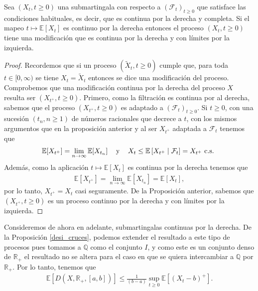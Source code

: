 \begin{proposition}
Sea $(X_t, t \geq 0)$ una submartingala con respecto a $(\mathcal{F}_t)_{t \geq 0}$ que satisface las condiciones habituales, es decir, que es continua por la derecha y completa. Si el mapeo $t \mapsto \mathbb{E}[X_t]$ es continuo por la derecha entonces el proceso $(X_t, t \geq 0)$ tiene una modificación que es continua por la derecha y con límites por la izquierda.
\end{proposition}
\begin{proof}
Recordemos que si un proceso $(\tilde{X}_t, t \geq 0)$ cumple que, para toda $t \in [0, \infty)$ se tiene $X_t = \tilde{X}_t$ entonces se dice una modificación del proceso. \\

Comprobemos que una modificación continua por la derecha del proceso $X$ resulta ser $(X_{t^{+}}, t \geq 0)$. Primero, como la filtración es continua por al derecha, sabemos que el proceso $(X_{t^{+}}, t \geq 0)$ es adaptado a $(\mathcal{F}_t)_{t \geq 0}$. Si $t \geq 0$, con una sucesión $(t_n, n \geq 1)$ de números racionales que decrece a $t$, con los mismos argumentos que en la proposición anterior y al ser $X_{t^{+}}$ adaptada a $\mathcal{F}_t$ tenemos que
\begin{align*}
	\mathbb{E}[X_{t^{+}}] = \lim_{n \rightarrow \infty} \mathbb{E}[X_{t_n}] \hspace{0.3cm} \text{ y } \hspace{0.3cm} X_t \leq \mathbb{E}\left[ X_{t^{+}} \mid  \mathcal{F}_t \right] = X_{t^{+}} \text{ c.s. }
\end{align*}
Además, como la aplicación $t \mapsto \mathbb{E}[X_t]$ es continua por la derecha tenemos que
\begin{align*}
\mathbb{E}[X_{t^{+}}] = \lim_{n \rightarrow \infty} \mathbb{E}[X_{t_n}] = \mathbb{E}[X_t], 
\end{align*}
por lo tanto, $X_{t^{+}} = X_t$ casi seguramente. De la Proposición anterior, sabemos que $(X_{t^{+}}, t \geq 0)$ es un proceso continuo por la derecha y con límites por la izquierda.
\end{proof}

Consideremos de ahora en adelante, submartingalas continuas por la derecha. De la Proposición \ref{desi_cruces}, podemos extender el resultado a este tipo de procesos pues tomamos a $\mathbb{Q}$ como el conjunto $I$, y como este es un conjunto denso de $\mathbb{R}_{+}$ el resultado no se altera para el caso en que se quiera intercambiar a $\mathbb{Q}$ por $\mathbb{R}_{+}$. Por lo tanto, tenemos que
\begin{align}
\mathbb{E} \left[ D(X, \mathbb{R}_{+}, [a, b]) \right] \leq \frac{1}{(b-a)} \sup_{t \geq 0} \mathbb{E} \left[ (X_t - b)^{+} \right]. \label{desi_cruces2}
\end{align}

